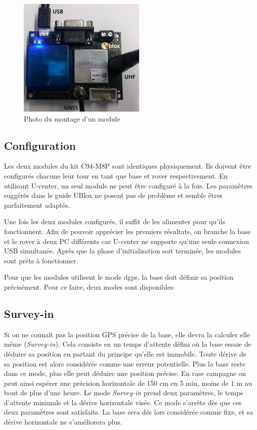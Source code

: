 \begin{figure}[!htbp]
    \centering
	\includegraphics{img/montage.jpg}
    \caption{Photo du montage d'un module}
\end{figure}

\subsection{Configuration}

Les deux modules du kit C94-M8P sont identiques physiquement. Ils doivent être
configurés chacune leur tour en tant que base et rover respectivement. En
utilisant U-center, un seul module ne peut être configuré à la fois. Les
paramètres suggérés dans le guide UBlox \cite{WEB08} ne posent pas de problème
et semble êtres parfaitement adaptés.

Une fois les deux modules configurés, il suffit de les alimenter pour qu'ils
fonctionnent.  Afin de pouvoir apprécier les premiers résultats, on branche la
base et le rover à deux PC différents car U-center ne supporte qu'une seule
connexion USB simultanée.  Après que la phase d'initialisation soit terminée,
les modules sont prêts à fonctionner.

Pour que les modules utilisent le mode \gls{dgps}, la base doit définir sa
position précisément. Pour ce faire, deux modes sont disponibles:

\subsection{Survey-in}
Si on ne connaît pas la position GPS précise de la base, elle devra la calculer
elle même (\textit{Survey-in}). Cela consiste en un temps d'attente défini où
la base essaie de déduire sa position en partant du principe qu'elle est
immobile. Toute dérive de sa position est alors considérée comme une erreur
potentielle. Plus la base reste dans ce mode, plus elle peut déduire une
position précise. En rase campagne on peut ainsi espérer une précision
horizontale de 150 cm en 5 min, moins de 1 m au bout de plus d'une heure. Le
mode \textit{Survey-in} prend deux paramètres, le temps d'attente minimale et
la dérive horizontale visée. Ce mode s'arrête dès que ces deux paramètres sont
satisfaits. La base sera dés lors considérée comme fixe, et sa dérive
horizontale ne s'améliorera plus.

